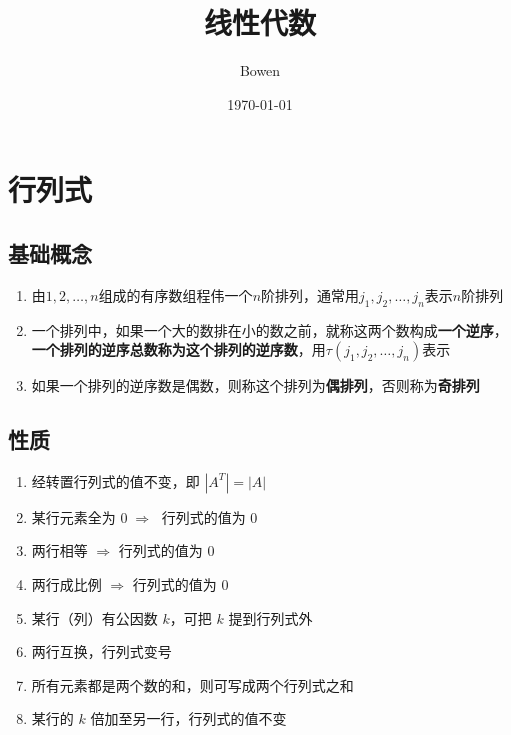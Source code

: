 \documentclass[a4paper,12pt]{article}
\begin{document}
    \title{线性代数}
    \author{Bowen}
    \date{\today}
    \maketitle
    \tableofcontents
    \newpage


    \section{行列式}

    \subsection{基础概念}
    \begin{enumerate}
        \item 由$1, 2, \dots, n$组成的有序数组程伟一个$n$阶排列，通常用$j_1, j_2, \dots, j_n$表示$n$阶排列
        \item 一个排列中，如果一个大的数排在小的数之前，就称这两个数构成\textbf{一个逆序}，\textbf{一个排列的逆序总数称为这个排列的逆序数}，用$\tau(j_1, j_2, \dots, j_n)$表示
        \item 如果一个排列的逆序数是偶数，则称这个排列为\textbf{偶排列}，否则称为\textbf{奇排列}
    \end{enumerate}

    \subsection{性质}

    \begin{enumerate}
        \item 经转置行列式的值不变，即 $|A^T| = |A|$
        \item 某行元素全为 $0 \;\Rightarrow\;$ 行列式的值为 0
        \item 两行相等 $\Rightarrow$ 行列式的值为 0
        \item 两行成比例 $\Rightarrow$ 行列式的值为 0
        \item 某行（列）有公因数 $k$，可把 $k$ 提到行列式外
        \item 两行互换，行列式变号
        \item {}所有元素都是两个数的和，则可写成两个行列式之和
        \item 某行的 $k$ 倍加至另一行，行列式的值不变
    \end{enumerate}
\end{document}
